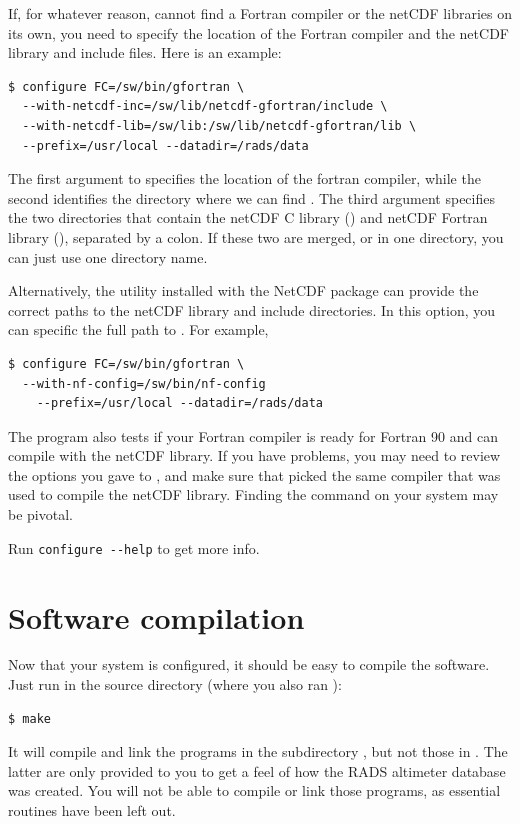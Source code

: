 \documentclass[a4paper,11pt,openany,natbib,nomargin]{thesis}
\begin{document}
If, for whatever reason,  cannot find a Fortran compiler or the netCDF libraries on its own, you need to specify the location of the Fortran compiler and the netCDF library and include files. Here is an example:
\begin{verbatim}
$ configure FC=/sw/bin/gfortran \
  --with-netcdf-inc=/sw/lib/netcdf-gfortran/include \
  --with-netcdf-lib=/sw/lib:/sw/lib/netcdf-gfortran/lib \
  --prefix=/usr/local --datadir=/rads/data
\end{verbatim}
The first argument to \prog{configure} specifies the location of the fortran compiler, while the second identifies the directory where we can find . The third argument specifies the two directories that contain the netCDF C library () and netCDF Fortran library (), separated by a colon. If these two are merged, or in one directory, you can just use one directory name.

Alternatively, the  utility installed with the NetCDF package can provide the correct paths to the netCDF library and include directories. In this option, you can specific the full path to . For example,
\begin{verbatim}
$ configure FC=/sw/bin/gfortran \
  --with-nf-config=/sw/bin/nf-config
	--prefix=/usr/local --datadir=/rads/data
\end{verbatim}

The  program also tests if your Fortran compiler is ready for Fortran 90 and can compile with the netCDF library. If you have problems, you may need to review the options you gave to , and make sure that \prog{configure} picked the same compiler that was used to compile the netCDF library. Finding the  command on your system may be pivotal.

Run \verb|configure --help| to get more info.

\section{Software compilation}
\label{sec:compilation}
Now that your system is configured, it should be easy to compile the software. Just run in the source directory (where you also ran ):
\begin{verbatim}
$ make
\end{verbatim}
It will compile and link the programs in the subdirectory \dir{src}, but not those in \dir{devel}. The latter are only provided to you to get a feel of how the RADS altimeter database was created. You will not be able to compile or link those programs, as essential routines have been left out.
\end{document}
